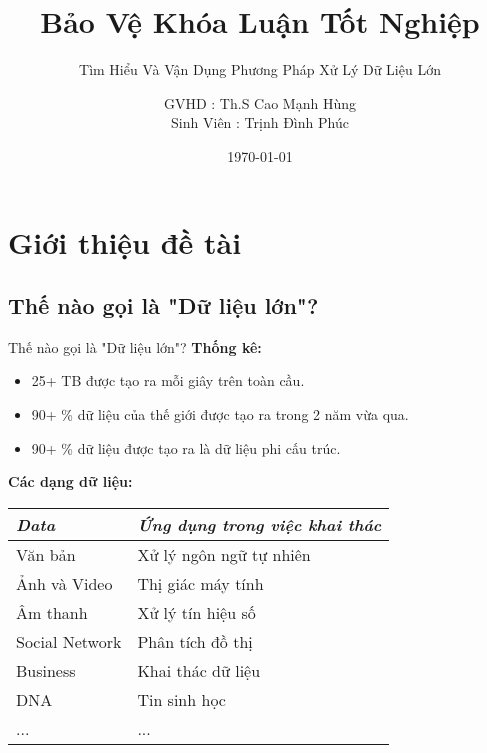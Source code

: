 \documentclass[13spt]{beamer}
\begin{document}
\title{Bảo Vệ Khóa Luận Tốt Nghiệp} 
\subtitle {Tìm Hiểu Và Vận Dụng Phương Pháp Xử Lý Dữ Liệu Lớn }


\author[ Trịnh Đình Phúc]{  \hspace{7mm} GVHD \hspace{5mm}: Th.S Cao Mạnh Hùng\\[3mm]{\hspace{1mm}Sinh Viên : Trịnh Đình Phúc\\ \hspace{18mm} }}

\date{\today} 

\frame{\titlepage} 



\section{Giới thiệu đề tài} 
\subsection{Thế nào gọi là "Dữ liệu lớn"?}
\begin{frame}{Thế nào gọi là "Dữ liệu lớn"?}
\textbf{Thống kê:}
	\begin{itemize}
		\item 25+ TB được tạo ra mỗi giây trên toàn cầu.  
		\item 90+ \% dữ liệu của thế giới được tạo ra trong 2 năm vừa qua.
		\item 90+ \% dữ liệu được tạo ra là dữ liệu phi cấu trúc.
	\end{itemize}
\vspace{2mm}
\textbf{Các dạng dữ liệu:}
  \begin{tabular} {l l }
  \toprule
  \it Data & \it Ứng dụng trong việc khai thác \\
  \midrule
  Văn bản & Xử lý ngôn ngữ tự nhiên  \\
  Ảnh và Video & Thị giác máy tính  \\  
  Âm thanh & Xử lý tín hiệu số  \\
  Social Network & Phân tích đồ thị  \\  
  Business & Khai thác dữ liệu  \\
  DNA & Tin sinh học \\           
  ... & ...\\            
  \bottomrule
  \end{tabular}
	
\end{frame}
\end{document}
